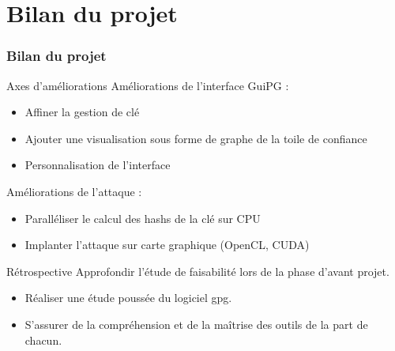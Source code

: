 \section{Bilan du projet}
  \begin{frame}
    \frametitle{\color{white}Bilan du projet}
    \begin{block}{Axes d'améliorations}
      Améliorations de l'interface GuiPG :
      \begin{itemize}
        \item Affiner la gestion de clé
        \item Ajouter une visualisation sous forme de graphe de la toile de confiance
        \item Personnalisation de l'interface
      \end{itemize}
      Améliorations de l'attaque :
      \begin{itemize}
        \item Paralléliser le calcul des hashs de la clé sur CPU
        \item Implanter l'attaque sur carte graphique (OpenCL, CUDA)
      \end{itemize}
    \end{block}
    
    \begin{block}{Rétrospective}
    Approfondir l'étude de faisabilité lors de la phase d'avant projet.
      \begin{itemize}
        \item Réaliser une étude poussée du logiciel gpg.
        \item S'assurer de la compréhension et de la maîtrise des outils de la part de chacun.
      \end{itemize}
    \end{block}


  \end{frame}
